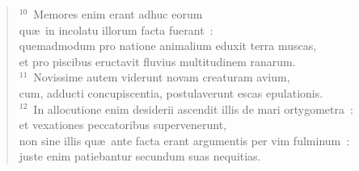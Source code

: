 \begin{flushleft}
\begin{verse}
${}^{10}$~Memores enim erant adhuc eorum\\ qu\ae\ in incolatu illorum facta fuerant~:\\ quemadmodum pro natione animalium eduxit terra muscas,\\ et pro piscibus eructavit fluvius multitudinem ranarum.\\
${}^{11}$~Novissime autem viderunt novam creaturam avium,\\ cum, adducti concupiscentia, postulaverunt escas epulationis.\\
${}^{12}$~In allocutione enim desiderii ascendit illis de mari ortygometra~:\\ et vexationes peccatoribus supervenerunt,\\ non sine illis qu\ae\ ante facta erant argumentis per vim fulminum~:\\ juste enim patiebantur secundum suas nequitias.\end{verse}\end{flushleft}


